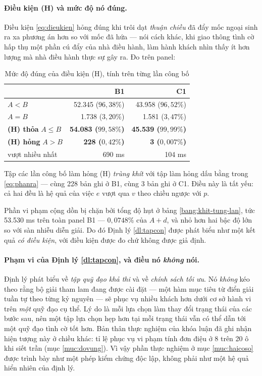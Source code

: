 \paragraph{Điều kiện (H) và mức độ nó đúng.} Điều kiện \eqref{eq:dieukien} hỏng đúng khi trôi dạt
\emph{thuận chiều} đã đẩy mốc ngoại sinh ra xa phương án hơn so với mốc đã hứa --- nói cách khác,
khi giao thông tình cờ hấp thụ một phần cú đẩy của nhà điều hành, làm hành khách nhìn thấy ít hơn
lượng mà nhà điều hành thực sự gây ra. Đo trên panel:

\begin{table}[htbp]
\centering
\caption{Mức độ đúng của điều kiện (H), tính trên từng lần công bố}
\label{bang:dieukien-h}
\small
\begin{tabular}{@{}lrr@{}}
\toprule
& \textbf{B1} & \textbf{C1}\\
\midrule
$A < B$ & 52.345 \;($96{,}38\%$) & 43.958 \;($96{,}52\%$)\\
$A = B$ & 1.738 \;($3{,}20\%$) & 1.581 \;($3{,}47\%$)\\
\midrule
\textbf{(H) thỏa} $A \le B$ & \textbf{54.083 \;($99{,}58\%$)} & \textbf{45.539 \;($99{,}99\%$)}\\
\textbf{(H) hỏng} $A > B$ & \textbf{228 \;($0{,}42\%$)} & \textbf{3 \;($0{,}007\%$)}\\
\quad vượt nhiều nhất & 690 ms & 104 ms\\
\bottomrule
\end{tabular}
\end{table}

Tập các lần công bố làm hỏng (H) \emph{trùng khít} với tập làm hỏng dấu bằng trong
\eqref{eq:phanra} --- cùng 228 bản ghi ở B1, cùng 3 bản ghi ở C1. Điều này là tất yếu: cả hai
đều là hệ quả của việc $e$ vượt qua $v$ theo chiều ngược với $p$.

Phần vi phạm cộng dồn bị chặn bởi tổng độ hụt ở bảng \ref{bang:khit-tung-lan}, tức 53.530 ms
trên toàn panel B1 --- $0{,}0748\%$ của $A+d$, và nhỏ hơn hai bậc độ lớn so với sàn nhiễu diễn
giải. Do đó Định lý \ref{dl:tapcon} được phát biểu như một kết quả \emph{có điều kiện}, với điều
kiện được đo chứ không được giả định.

\paragraph{Phạm vi của Định lý \ref{dl:tapcon}, và điều nó \emph{không} nói.} Định lý phát biểu
về \emph{tập quỹ đạo khả thi} và về \emph{chính sách tối ưu}. Nó \emph{không} kéo theo rằng bộ
giải tham lam đang được cài đặt --- một hàm mục tiêu từ điển giải tuần tự theo từng kỷ nguyên ---
sẽ phục vụ nhiều khách hơn dưới cơ sở hành vi trên \emph{một} quỹ đạo cụ thể. Lý do là mỗi lựa
chọn làm thay đổi trạng thái của các bước sau, nên một tập lựa chọn hẹp hơn tại mỗi trạng thái
vẫn có thể dẫn tới một quỹ đạo tình cờ tốt hơn. Bản thân thực nghiệm của khóa luận đã ghi nhận
hiện tượng này ở chiều khác: tỉ lệ phục vụ vi phạm tính đơn điệu ở 8 trên 20 ô khi siết trần
(mục \ref{muc:dovung}). Vì vậy phần thực nghiệm ở mục \ref{muc:haicoso} được trình bày như một
phép kiểm chứng độc lập, không phải như một hệ quả hiển nhiên của định lý.

